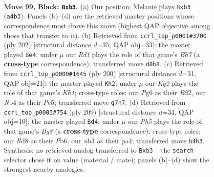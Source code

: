 \documentclass[11pt]{article}
\begin{document}
\clearpage

\begin{figure}[p]\centering
\begin{subfigure}{0.46\textwidth}\centering
\resizebox{\linewidth}{!}{%
\newchessgame
\chessboard[
  setfen={3r4/5pk1/6p1/4P3/bnB2P1p/1N4P1/5K2/8 b - - 0 99},
  showmover=false,
  pgfstyle=straightmove, color=movearrow, markmove={a4-b3}
]}
\caption{}
\end{subfigure}\hfill
\begin{subfigure}{0.46\textwidth}\centering
\resizebox{\linewidth}{!}{%
\newchessgame
\chessboard[
  setfen={8/7B/p6p/P3k1p1/5n1P/4KPB1/8/5b2 w - - 10 102},
  showmover=false,
  pgfstyle=straightmove, color=movearrow, markmove={h7-e4}
]}
\caption{}
\end{subfigure}
\\[4pt]
\begin{subfigure}{0.46\textwidth}\centering
\resizebox{\linewidth}{!}{%
\newchessgame
\chessboard[
  setfen={8/8/P1b4p/2P2kp1/5p1P/8/3B2P1/7K w - - 2 101},
  showmover=false,
  pgfstyle=straightmove, color=movearrow, markmove={h1-h2}
]}
\caption{}
\end{subfigure}\hfill
\begin{subfigure}{0.46\textwidth}\centering
\resizebox{\linewidth}{!}{%
\newchessgame
\chessboard[
  setfen={4B3/8/1p4p1/6k1/P1P3p1/6P1/4K2P/6b1 b - - 66 105},
  showmover=false,
  pgfstyle=straightmove, color=movearrow, markmove={g1-d4}
]}
\caption{}
\end{subfigure}
\caption{\textbf{Move 99, Black: \texttt{Bxb3}.} (a) Our position; Melanie plays \texttt{Bxb3} (\texttt{a4b3}). Panels (b)--(d) are the retrieved master positions whose correspondence most drove this move (highest QAP objective among those that transfer to it). (b) Retrieved from \texttt{ccrl\_top\_p0001\#3700} (ply 202) [structural distance $d$=35, QAP obj=33]: the master played \texttt{Be4}; under $\mu$ our \emph{Rd1} plays the role of that game's \emph{Bh7} (a \textbf{cross-type} correspondence); transferred move \texttt{d8h8}. (c) Retrieved from \texttt{ccrl\_top\_p0000\#1645} (ply 200) [structural distance $d$=31, QAP obj=21]: the master played \texttt{Kh2}; under $\mu$ our \emph{Kg2} plays the role of that game's \emph{Kh1}; cross-type roles: our \emph{P}g6 as their \emph{B}d2, our \emph{N}b4 as their \emph{P}c5; transferred move \texttt{g7h7}. (d) Retrieved from \texttt{ccrl\_top\_p0003\#754} (ply 209) [structural distance $d$=34, QAP obj=10]: the master played \texttt{Bd4}; under $\mu$ our \emph{Ph5} plays the role of that game's \emph{Bg8} (a \textbf{cross-type} correspondence); cross-type roles: our \emph{R}d8 as their \emph{P}b6, our \emph{n}b3 as their \emph{p}a4; transferred move \texttt{h4h3}. Synthesis: no retrieved analog transferred to \texttt{Bxb3} -- the \texttt{search} selector chose it on value (material / mate); panels (b)--(d) show the strongest nearby analogies.}
\label{fig:thought-m197}
\end{figure}
\end{document}
